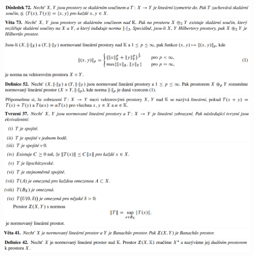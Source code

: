 \documentclass[12pt,a4paper]{article}
\begin{document}
\begin{center}
		\includegraphics[width=\textwidth]{img/2banHilb/2020-06-20 17 19 06.png}\vspace{0.3cm}
		\includegraphics[width=\textwidth]{img/2banHilb/2020-06-20 17 19 12.png}\vspace{0.3cm}
		\includegraphics[width=\textwidth]{img/2banHilb/2020-06-20 17 19 36.png}\vspace{0.3cm}
		\includegraphics[width=\textwidth]{img/2banHilb/2020-06-20 17 20 16.png}\vspace{0.3cm}
		\includegraphics[width=\textwidth]{img/2banHilb/2020-06-20 17 20 29.png}\vspace{0.3cm}
		\includegraphics[width=\textwidth]{img/2banHilb/2020-06-20 17 20 42.png}\vspace{0.3cm}
		\includegraphics[width=\textwidth]{img/2banHilb/2020-06-20 17 21 19.png}\vspace{0.3cm}
		\includegraphics[width=\textwidth]{img/2banHilb/2020-06-20 17 21 26.png}\vspace{0.3cm}

\end{center}
\end{document}
